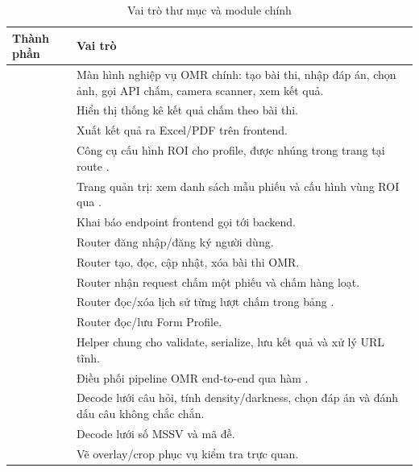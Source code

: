\begin{longtable}{|L{5.0cm}|L{9.0cm}|}
\caption{Vai trò thư mục và module chính}
\label{tab:vai-tro-module}\\
\hline
\textbf{Thành phần} & \textbf{Vai trò} \\
\hline
{} & Màn hình nghiệp vụ OMR chính: tạo bài thi, nhập đáp án, chọn ảnh, gọi API chấm, camera scanner, xem kết quả. \\
\hline
{} & Hiển thị thống kê kết quả chấm theo bài thi. \\
\hline
{} & Xuất kết quả ra Excel/PDF trên frontend. \\
\hline
{} & Công cụ cấu hình ROI cho profile, được nhúng trong trang  tại route . \\
\hline
{} & Trang quản trị: xem danh sách mẫu phiếu và cấu hình vùng ROI qua . \\
\hline
{} & Khai báo endpoint frontend gọi tới backend. \\
\hline
{} & Router đăng nhập/đăng ký người dùng. \\
\hline
{} & Router tạo, đọc, cập nhật, xóa bài thi OMR. \\
\hline
{} & Router nhận request chấm một phiếu và chấm hàng loạt. \\
\hline
{} & Router đọc/xóa lịch sử từng lượt chấm trong bảng . \\
\hline
{} & Router đọc/lưu Form Profile. \\
\hline
{} & Helper chung cho validate, serialize, lưu kết quả và xử lý URL tĩnh. \\
\hline
{} & Điều phối pipeline OMR end-to-end qua hàm . \\
\hline
{} & Decode lưới câu hỏi, tính density/darkness, chọn đáp án và đánh dấu câu không chắc chắn. \\
\hline
{} & Decode lưới số MSSV và mã đề. \\
\hline
{} & Vẽ overlay/crop phục vụ kiểm tra trực quan. \\

\end{longtable}
